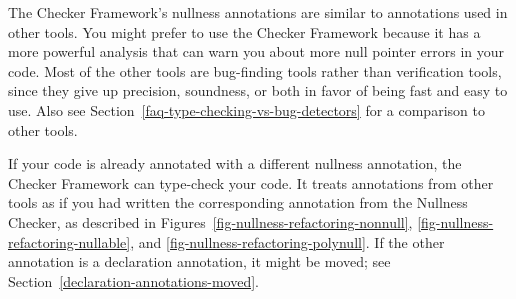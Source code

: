 The Checker Framework's nullness annotations are similar to annotations used
in other
tools.
You might prefer to use the Checker Framework because it has a more
powerful analysis that can warn you about more null pointer errors in your
code.
Most of the other tools are bug-finding tools rather than verification tools, since they
give up precision, soundness, or both in favor of being fast and
easy to use.  Also
see Section~\ref{faq-type-checking-vs-bug-detectors} for a comparison to other tools.

If your code is already annotated with a different nullness
annotation, the Checker Framework can type-check your code.
It treats annotations from other tools
as if you had written the corresponding annotation from the
Nullness Checker, as described in Figures~\ref{fig-nullness-refactoring-nonnull},
\ref{fig-nullness-refactoring-nullable}, and
\ref{fig-nullness-refactoring-polynull}.
If the other annotation is a declaration annotation, it might be moved; see
Section~\ref{declaration-annotations-moved}.




